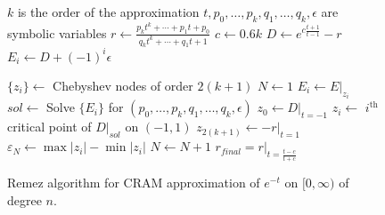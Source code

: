 \begin{figure}
  \caption{Remez algorithm for CRAM approximation of $e^{-t}$ on $[0, \infty)$
  of degree $n$.}
  \label{remez-pseudocode}
  \begin{algorithmic}
    \STATE {}
    \STATE $k$ is the order of the approximation
    \STATE \COMMENT{translate $[0, \infty)$ to $[-1, 1)$}
    \STATE $t, p_0, \ldots, p_k, q_1, \ldots, q_k, \epsilon$ are symbolic variables
    \STATE $r \leftarrow \frac{p_kt^k + \cdots + p_1t + p_0}{q_kt^k + \cdots +
      q_1t + 1}$
    \STATE $c \leftarrow 0.6k$
    \STATE $D \leftarrow e^{c\frac{t+1}{t-1}} - r$
    \STATE $E_i \leftarrow D + (-1)^i\epsilon$

    \STATE $\{z_i\} \leftarrow$ Chebyshev nodes of order $2(k+1)$
    \STATE $N \leftarrow 1$
    \REPEAT
      \STATE $E_i \leftarrow E|_{z_i}$
      \STATE $sol \leftarrow$ Solve $\{E_i\}$ for $(p_0,\ldots,p_k,q_1,\ldots,q_k,\epsilon)$
      \STATE $z_0 \leftarrow D|_{t=-1}$
      \STATE $z_i \leftarrow$ $i^\mathrm{th}$ critical point of $D|_{sol}$ on $(-1, 1)$
      \STATE $z_{2(k + 1)} \leftarrow -r|_{t=1}$ 
      \STATE $\varepsilon_N \leftarrow \max{|z_i|} - \min{|z_i|}$
      \STATE $N \leftarrow N + 1$
    \STATE $r_{final} = r|_{t=\frac{t - c}{t + c}}$ \COMMENT{translate $[-1, 1)$ back to $[0, \infty)$ and normalize $q_0=1$}
  \end{algorithmic}
\end{figure}
